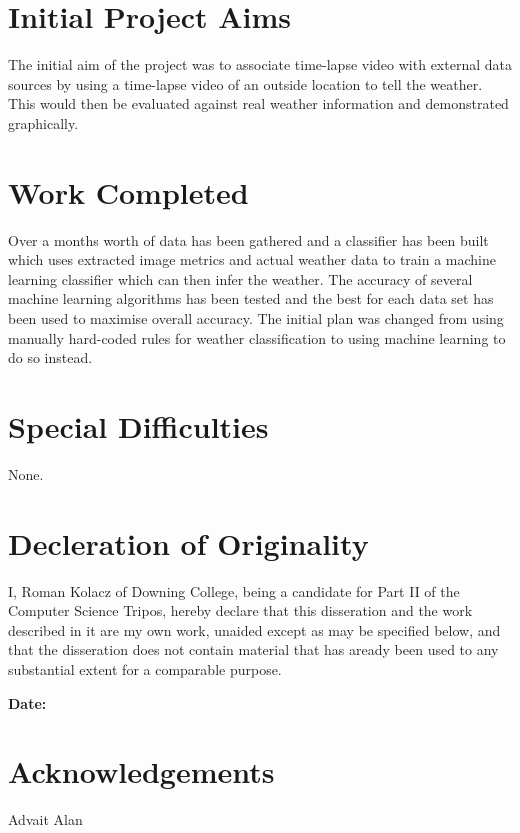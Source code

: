 \documentclass[a4paper,12pt,twoside]{report}
\begin{document}
\section*{Initial Project Aims}
The initial aim of the project was to associate time-lapse video with external data sources by using a time-lapse video of an outside location to tell the weather. This would then be evaluated against real weather information and demonstrated graphically.

\section*{Work Completed}
Over a months worth of data has been gathered and a classifier has been built which uses extracted image metrics and actual weather data to train a machine learning classifier which can then infer the weather.
The accuracy of several machine learning algorithms has been tested and the best for each data set has been used to maximise overall accuracy. 
The initial plan was changed from using manually hard-coded rules for weather classification to using machine learning to do so instead.

\section*{Special Difficulties}
None.
\section*{Decleration of Originality}
I, Roman Kolacz of Downing College, being a candidate for Part II of the Computer Science Tripos, hereby declare that this disseration and the work described in it are my own work, unaided except as may be specified below, and that the disseration does not contain material that has aready been used to any substantial extent for a comparable purpose.

\bigskip
{}

\bigskip
\leftline\bf{\bf Date:}

\newpage

\section*{Acknowledgements}
Advait 
Alan 

\tableofcontents

\listoffigures

\end{document}
